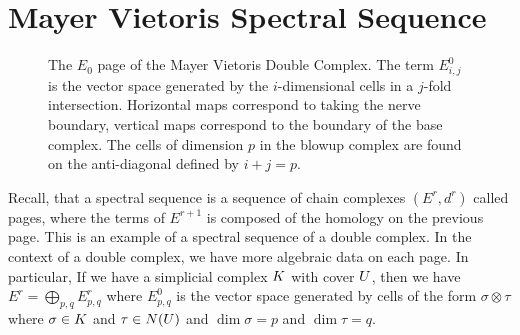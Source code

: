 \section{Mayer Vietoris Spectral Sequence}
\begin{figure}[h]
\centering
{}
\caption{The $E_0$ page of the Mayer Vietoris Double Complex. The term $E^0_{i,j}$ is the vector space generated by the $i$-dimensional cells in a $j$-fold intersection. Horizontal maps correspond to taking the nerve boundary, vertical maps correspond to the boundary of the base complex. The cells of dimension $p$ in the blowup complex are found on the anti-diagonal defined by $i+j = p$.}
\end{figure}
Recall, that a spectral sequence is a sequence of chain complexes $(E^r, d^r)$ called pages, where the terms of $E^{r+1}$ is composed of the homology on the previous page. This is an example of a spectral sequence of a double complex. In the context of a double complex, we have more algebraic data on each page. In particular, If we have a simplicial complex $K$ with cover $U$, then we have $E^r = \bigoplus_{p,q} E^r_{p,q}$ where $E^0_{p,q}$ is the vector space generated by cells of the form $\sigma \otimes \tau$ where $\sigma \in K$ and $\tau \in N(U)$ and $\dim{\sigma} = p$ and $\dim{\tau} = q$. 
